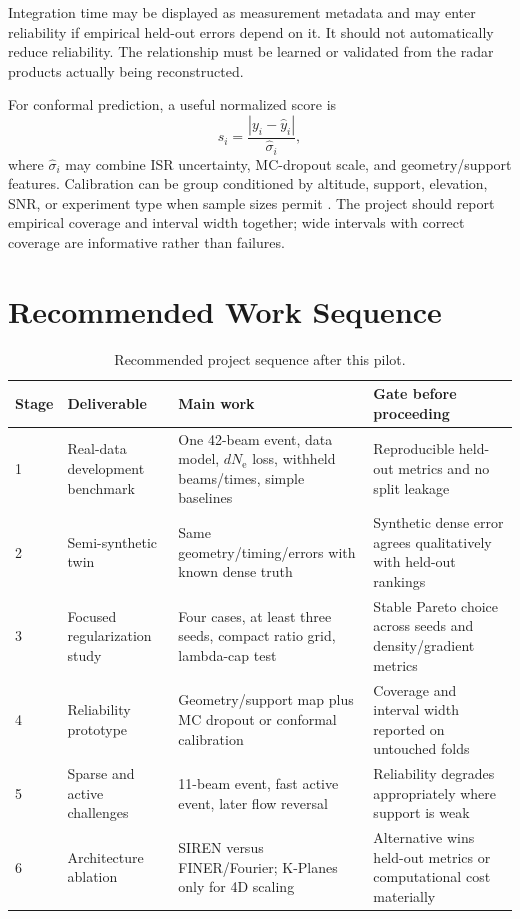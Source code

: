\documentclass[11pt]{article}
\newcommand{\Ne}{N_{\mathrm e}}
\begin{document}
Integration time may be displayed as measurement metadata and may enter reliability if empirical held-out
errors depend on it. It should not automatically reduce reliability. The relationship must be learned or
validated from the radar products actually being reconstructed.

For conformal prediction, a useful normalized score is
\begin{equation}
  s_i = \frac{|y_i-\widehat y_i|}{\widehat\sigma_i},
\end{equation}
where $\widehat\sigma_i$ may combine ISR uncertainty, MC-dropout scale, and geometry/support features.
Calibration can be group conditioned by altitude, support, elevation, SNR, or experiment type when sample
sizes permit \cite{AngelopoulosBates2021,Romano2019CQR}. The project should report empirical coverage and
interval width together; wide intervals with correct coverage are informative rather than failures.

\section{Recommended Work Sequence}

\begin{table}[H]
\centering
\caption{Recommended project sequence after this pilot.}
\label{tab:sequence}
\small
\begin{tabularx}{\textwidth}{p{}p{}X p{}}
\toprule
Stage & Deliverable & Main work & Gate before proceeding \\
\midrule
1 & Real-data development benchmark & One 42-beam event, data model, $d\Ne$ loss, withheld beams/times, simple baselines & Reproducible held-out metrics and no split leakage \\
2 & Semi-synthetic twin & Same geometry/timing/errors with known dense truth & Synthetic dense error agrees qualitatively with held-out rankings \\
3 & Focused regularization study & Four cases, at least three seeds, compact ratio grid, lambda-cap test & Stable Pareto choice across seeds and density/gradient metrics \\
4 & Reliability prototype & Geometry/support map plus MC dropout or conformal calibration & Coverage and interval width reported on untouched folds \\
5 & Sparse and active challenges & 11-beam event, fast active event, later flow reversal & Reliability degrades appropriately where support is weak \\
6 & Architecture ablation & SIREN versus FINER/Fourier; K-Planes only for 4D scaling & Alternative wins held-out metrics or computational cost materially \\
\bottomrule
\end{tabularx}
\end{table}
\end{document}
